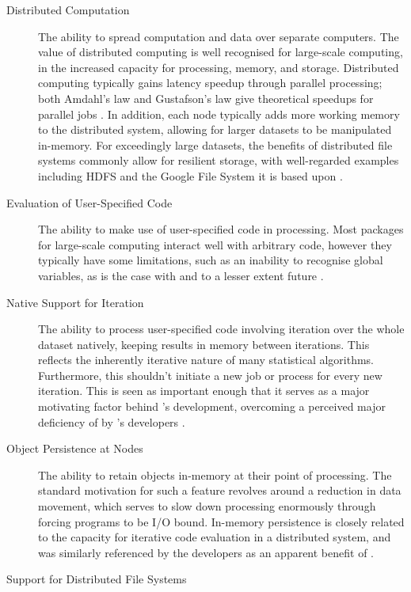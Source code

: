 \begin{description} \item[Distributed Computation] The ability to spread computation and data over separate computers.
		The value of distributed computing is well recognised for large-scale computing, in the increased capacity for processing, memory, and storage.
		Distributed computing typically gains latency speedup through parallel processing; both Amdahl's law and Gustafson's law give theoretical speedups for parallel jobs \cites{amdahl1967law,gustafson1988law}.
		In addition, each node typically adds more working memory to the distributed system, allowing for larger datasets to be manipulated in-memory.
		For exceedingly large datasets, the benefits of distributed file systems commonly allow for resilient storage, with well-regarded examples including HDFS and the Google File System it is based upon \cites{shvachko2010hadoop,ghemawat2003google}.
	\item[Evaluation of User-Specified Code]
		The ability to make use of user-specified code in processing.
		Most \R{} packages for large-scale computing interact well with arbitrary code, however they typically have some limitations, such as an inability to recognise global variables, as is the case with  and to a lesser extent future \cites{sparklyr2020limitations,microsoft20}.
	\item[Native Support for Iteration]
		The ability to process user-specified code involving iteration over the
		whole dataset natively, keeping results in memory between iterations.
		This reflects the inherently iterative nature of many statistical algorithms.
		Furthermore, this shouldn't initiate a new job or process for every new iteration.
		This is seen as important enough that it serves as a major motivating factor behind 's development, overcoming a perceived major deficiency of  by 's developers \cite{zaharia2010spark}.
	\item[Object Persistence at Nodes]
		The ability to retain objects in-memory at their point of processing.
		The standard motivation for such a feature revolves around a reduction in data movement, which serves to slow down processing enormously through forcing programs to be I/O bound.
		In-memory persistence is closely related to the capacity for iterative code evaluation in a distributed system, and was similarly referenced by the  developers as an apparent benefit of \cite{zaharia2010spark}.
	\item[Support for Distributed File Systems]

\end{description}
